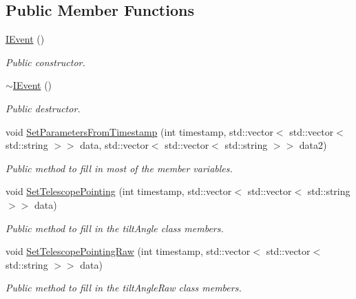 \subsection*{Public Member Functions}
\begin{DoxyCompactItemize}
\item 
\mbox{\label{classIEvent_a57ac7b21eb2e2ebf74889caf85e3991b}} 
\hyperlink{classIEvent_a57ac7b21eb2e2ebf74889caf85e3991b}{I\+Event} ()
\begin{DoxyCompactList}\small\item\em Public constructor. \end{DoxyCompactList}\item 
\mbox{\label{classIEvent_ad5e125fd626f0f68152b54472103cc97}} 
\hyperlink{classIEvent_ad5e125fd626f0f68152b54472103cc97}{$\sim$\+I\+Event} ()
\begin{DoxyCompactList}\small\item\em Public destructor. \end{DoxyCompactList}\item 
void \hyperlink{classIEvent_a353512fe50f24076e44296f2b0b49519}{Set\+Parameters\+From\+Timestamp} (int timestamp, std\+::vector$<$ std\+::vector$<$ std\+::string $>$$>$ data, std\+::vector$<$ std\+::vector$<$ std\+::string $>$$>$ data2)
\begin{DoxyCompactList}\small\item\em Public method to fill in most of the member variables. \end{DoxyCompactList}\item 
void \hyperlink{classIEvent_aa8d04ba13fcb090b50c25eb07358b9ef}{Set\+Telescope\+Pointing} (int timestamp, std\+::vector$<$ std\+::vector$<$ std\+::string $>$$>$ data)
\begin{DoxyCompactList}\small\item\em Public method to fill in the tilt\+Angle class members. \end{DoxyCompactList}\item 
void \hyperlink{classIEvent_a8e05e96983ecca92b777dab1bb7b539a}{Set\+Telescope\+Pointing\+Raw} (int timestamp, std\+::vector$<$ std\+::vector$<$ std\+::string $>$$>$ data)
\begin{DoxyCompactList}\small\item\em Public method to fill in the tilt\+Angle\+Raw class members. \end{DoxyCompactList}\item 

\end{DoxyCompactItemize}
